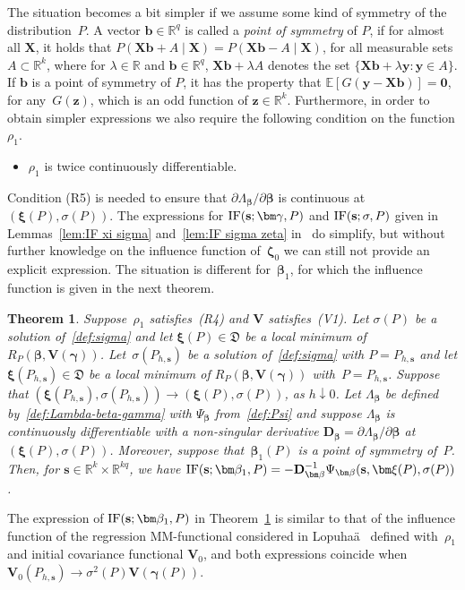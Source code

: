 \documentclass{article}
\numberwithin{equation}{section}
\theoremstyle{plain}
\newtheorem{theorem}{Theorem}
\newcommand{\R}{\mathbb{R}}
\newcommand{\bbeta}{\bm\beta}
\newcommand{\bxi}{\bm\xi}
\newcommand{\bgamma}{\bm\gamma}
\newcommand{\bzeta}{\bm\zeta}
\newcommand{\by}{\mathbf{y}}
\newcommand{\bs}{\mathbf{s}}
\newcommand{\bz}{\mathbf{z}}
\newcommand{\bb}{\mathbf{b}}
\newcommand{\bX}{\mathbf{X}}
\newcommand{\bV}{\mathbf{V}}
\newcommand{\bD}{\mathbf{D}}
\newcommand{\E}{\mathbb{E}}
\begin{document}
The situation becomes a bit simpler if we assume some kind of symmetry of the distribution~$P$.
A vector $\bb\in\R^q$ is called a \emph{point of symmetry} of $P$, if for almost all $\bX$, it holds that
$P\left(\bX\bb+A\mid\bX\right)
=
P\left(\bX\bb-A\mid\bX\right)$,
for all measurable sets $A\subset\R^k$,
where for $\lambda\in\R$ and $\bb\in\R^q$,
$\bX\bb+\lambda A$ denotes the set $\{\bX\bb+\lambda \by:\by\in A\}$.
If $\bb$ is a point of symmetry of $P$, it has the property that
$\E[G(\by-\bX\bb)]=\mathbf{0}$,
for any~$G(\bz)$, which is an odd function of $\bz\in\R^k$.
Furthermore, in order to obtain simpler expressions we also require the following condition on the function $\rho_1$.
\begin{itemize}
\item[(R5)]
$\rho_1$ is twice continuously differentiable.
\end{itemize}
Condition (R5) is needed to ensure
that $\partial\Lambda_{\bbeta}/\partial\bbeta$ is continuous at $(\bxi(P),\sigma(P))$.
The expressions for $\text{\rm IF}(\bs;\bgamma,P)$ and $\text{\rm IF}(\bs;\sigma,P)$ 
given in Lemmas~\ref{lem:IF xi sigma} and~\ref{lem:IF sigma zeta} in~\cite{supplement2025}
do simplify, but without further knowledge on the influence function
of~$\bzeta_0$ we can still not provide an explicit expression.
The situation is different for~$\bbeta_1$,
for which the influence function is given in the next theorem.
\begin{theorem}
\label{th:point of symmetry}
Suppose~$\rho_1$ satisfies~(R4) and $\bV$ satisfies~(V1).
Let $\sigma(P)$ be a solution of~\eqref{def:sigma} and let 
$\bxi(P)\in \mathfrak{D}$ be a local minimum of~$R_P(\bbeta,\bV(\bgamma))$.
Let~$\sigma(P_{h,\bs})$ be a solution of~\eqref{def:sigma} with $P=P_{h,\bs}$
and let $\bxi(P_{h,\bs})\in \mathfrak{D}$ be a local minimum of $R_P(\bbeta,\bV(\bgamma))$ with~$P=P_{h,\bs}$.
Suppose that $(\bxi(P_{h,\bs}),\sigma(P_{h,\bs}))\to(\bxi(P),\sigma(P))$,
as $h\downarrow0$.
Let $\Lambda_{\bbeta}$ be defined by~\eqref{def:Lambda-beta-gamma}
with $\Psi_{\bbeta}$ from~\eqref{def:Psi}
and suppose $\Lambda_{\bbeta}$ is continuously differentiable  
with a non-singular derivative 
$\bD_{\bbeta}=\partial\Lambda_{\bbeta}/\partial\bbeta$ at $(\bxi(P),\sigma(P))$.
Moreover, suppose that~$\bbeta_1(P)$ is a point of symmetry of~$P$.
Then, for $\bs\in\R^k\times\R^{kq}$, we have $\text{\rm IF}(\bs;\bbeta_1,P)=-\bD_{\bbeta}^{-1}\Psi_{\bbeta}(\bs,\bxi(P),\sigma(P))$.
\end{theorem}
The expression of $\text{\rm IF}(\bs;\bbeta_1,P)$ in Theorem~\ref{th:point of symmetry} 
is similar to that of the influence function of the regression MM-functional considered in Lopuha\"a~\cite{lopuhaa2023}
defined with~$\rho_1$ and initial covariance functional $\bV_0$, and both expressions
coincide when $\bV_0(P_{h,\bs})\to\sigma^2(P)\bV(\bgamma(P))$.
\end{document}
